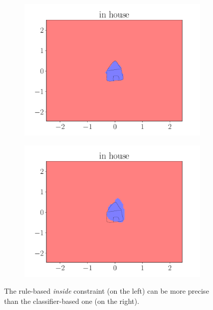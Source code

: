 \begin{figure}[ht]
    \centering
        \begin{subfigure}{0.45\textwidth}
            \centering
            \includegraphics[width=\textwidth]{figures/in_house_rule.pdf}
        \end{subfigure}
        \begin{subfigure}{0.45\textwidth}
            \centering
            \includegraphics[width=\textwidth]{figures/in_house_classifier.pdf}
        \end{subfigure}
    \caption[\emph{Inside} constraint comparison]{The rule-based \emph{inside} constraint (on the left) can be more precise than the classifier-based one (on the right).}
    \label{fig:boundaries:4}
\end{figure}

